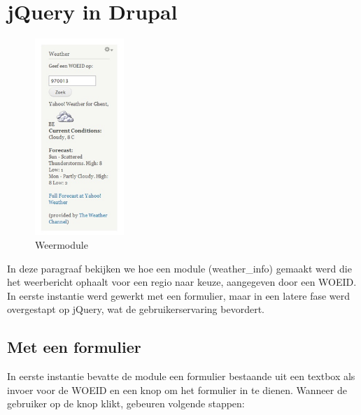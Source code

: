 \newpage

\section{jQuery in Drupal}

\begin{figure}
\vspace{-40pt}
\hspace{-10pt}
\centering
\includegraphics[width=0.3\textwidth]{fig/weermodule}
\vspace{-30pt}
\hspace{-10pt}
\centering
\caption{Weermodule}
\label{fig:weermodule}
\vspace{-70pt}
\end{figure}

In deze paragraaf bekijken we hoe een module (weather\_info) gemaakt werd die het weerbericht ophaalt voor een regio naar keuze, aangegeven door een WOEID. In eerste instantie werd gewerkt met een formulier, maar in een latere fase werd overgestapt op jQuery, wat de gebruikerservaring bevordert.

\subsection{Met een formulier}

In eerste instantie bevatte de module een formulier bestaande uit een textbox als invoer voor de WOEID en een knop om het formulier in te dienen.
Wanneer de gebruiker op de knop klikt, gebeuren volgende stappen:

